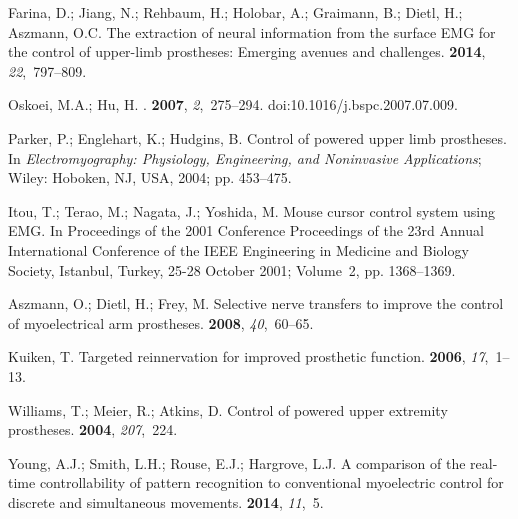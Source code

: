 \documentclass[sensors,review,accept,moreauthors,pdftex]{Definitions/mdpi}
\begin{document}
\begin{thebibliography}{999}
Farina, D.; Jiang, N.; Rehbaum, H.; Holobar, A.; Graimann, B.; Dietl, H.;
  Aszmann, O.C.
\newblock The extraction of neural information from the surface EMG for the
  control of upper-limb prostheses: Emerging avenues and challenges.
 {\bf 2014}, {\em 22},~797--809.

Oskoei, M.A.; Hu, H.
.
 {\bf 2007}, {\em
  2},~275--294. doi:10.1016/j.bspc.2007.07.009.

Parker, P.; Englehart, K.; Hudgins, B.
\newblock Control of powered upper limb prostheses.
In {\em Electromyography: Physiology, Engineering, and Noninvasive
  Applications}; 	Wiley:  Hoboken, NJ, USA, { 2004};  pp. 453--475.

Itou, T.; Terao, M.; Nagata, J.; Yoshida, M.
\newblock Mouse cursor control system using EMG.
In {Proceedings of the 2001 Conference Proceedings of the 23rd Annual International Conference of the IEEE Engineering in Medicine and Biology Society,} Istanbul, Turkey, 25-28 October 2001; Volume~2, pp. 1368--1369.

Aszmann, O.; Dietl, H.; Frey, M.
\newblock Selective nerve transfers to improve the control of myoelectrical arm
  prostheses.
 {\bf 2008}, {\em 40},~60--65.

Kuiken, T.
\newblock Targeted reinnervation for improved prosthetic function.
 {\bf 2006}, {\em
  17},~1--13.

Williams, T.; Meier, R.; Atkins, D.
\newblock Control of powered upper extremity prostheses.
 {\bf 2004}, {\em 207},~224.

Young, A.J.; Smith, L.H.; Rouse, E.J.; Hargrove, L.J.
\newblock A comparison of the real-time controllability of pattern recognition
  to conventional myoelectric control for discrete and simultaneous movements.
 {\bf 2014}, {\em
  11},~5.


\end{thebibliography}
\end{document}

